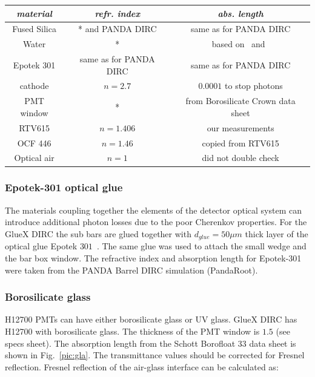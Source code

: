 \documentclass[11pt, a4paper]{article}
\begin{document}
\vspace{0.5cm}
\begin{tabular}{| c | c | c |}
\hline
\textit{material} & \textit{refr. index} & \textit{abs. length} \\
\hline
Fused Silica & * and PANDA DIRC & same as for PANDA DIRC \\
\hline
Water & * & based on~\cite{water} and~\cite{water2} \\
\hline
Epotek 301 & same as for PANDA DIRC & same as for PANDA DIRC \\
\hline
cathode & $n = 2.7$ & $0.0001$ to stop photons \\
\hline
PMT window & * &  from Borosilicate Crown data sheet \\
\hline
RTV615 & $n = 1.406$ & our measurements \\
\hline
OCF 446 & $n = 1.46$ & copied from RTV615 \\
\hline
Optical air & $n = 1$ & did not double check \\
\hline
\end{tabular}
\vspace{0.5cm}


\subsubsection*{Epotek-301 optical glue}

The materials coupling together the elements of the detector optical system can introduce additional photon losses due to the poor Cherenkov properties. For the GlueX DIRC the sub bars are glued together with $d_{glue} = 50 \mu m$ thick layer of the optical glue Epotek $301$~\cite{Epotek}. The same glue was used to attach the small wedge and the bar box window. The refractive index and absorption length for Epotek-301 were taken from the PANDA Barrel DIRC simulation (PandaRoot).

\subsubsection*{Borosilicate glass}

H12700 PMTs can have either borosilicate glass or UV glass. GlueX DIRC has H12700 with borosilicate glass. The thickness of the PMT window is $1.5$ (see specs sheet). The absorption length from the Schott Borofloat 33 data sheet is shown in Fig.~\ref{pic:gla}. The transmittance values should be corrected for Fresnel reflection. Fresnel reflection of the air-glass interface can be calculated as:
\end{document}
